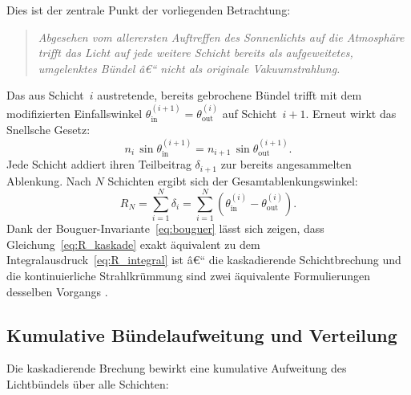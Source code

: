 ﻿\documentclass[12pt,a4paper]{article}
\begin{document}
Dies ist der zentrale Punkt der vorliegenden Betrachtung:
\begin{quote}
  \itshape
  Abgesehen vom allerersten Auftreffen des Sonnenlichts auf die
  Atmosphäre trifft das Licht auf jede weitere Schicht bereits
  als aufgeweitetes, umgelenktes Bündel â€“ nicht als originale
  Vakuumstrahlung.
\end{quote}

Das aus Schicht~$i$ austretende, bereits gebrochene Bündel trifft
mit dem modifizierten Einfallswinkel
$\theta_{\mathrm{in}}^{(i+1)} = \theta_{\mathrm{out}}^{(i)}$
auf Schicht~$i+1$.
Erneut wirkt das Snellsche Gesetz:
\begin{equation}
  n_i\,\sin\theta_{\mathrm{in}}^{(i+1)}
  = n_{i+1}\,\sin\theta_{\mathrm{out}}^{(i+1)}.
  \label{eq:snell_kaskade}
\end{equation}
Jede Schicht addiert ihren Teilbeitrag $\delta_{i+1}$ zur bereits
angesammelten Ablenkung.
Nach $N$ Schichten ergibt sich der Gesamtablenkungswinkel:
\begin{equation}
  R_N = \sum_{i=1}^{N} \delta_i
      = \sum_{i=1}^{N}
        \left(\theta_{\mathrm{in}}^{(i)} - \theta_{\mathrm{out}}^{(i)}\right).
  \label{eq:R_kaskade}
\end{equation}
Dank der Bouguer-Invariante~\eqref{eq:bouguer} lässt sich zeigen,
dass Gleichung~\eqref{eq:R_kaskade} exakt äquivalent zu dem
Integralausdruck~\eqref{eq:R_integral} ist â€“
die kaskadierende Schichtbrechung und die kontinuierliche
Strahlkrümmung sind zwei äquivalente Formulierungen desselben Vorgangs
\citep{BornWolf1999}.

\subsection{Kumulative Bündelaufweitung und Verteilung}

Die kaskadierende Brechung bewirkt eine kumulative Aufweitung des
Lichtbündels über alle Schichten:
\end{document}
